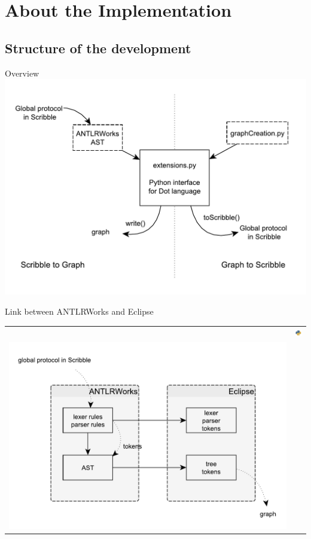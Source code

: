 \documentclass[8 pt]{beamer}
\begin{document}
\section{About the Implementation}

\subsection{Structure of the development}
\begin{frame}{Overview}
\includegraphics[scale=0.6]{structure}
\end{frame}

\begin{frame}{Link between ANTLRWorks and Eclipse}
\begin{tabular}{lr}
 &\includegraphics[width=0.7cm]{python}\\
\includegraphics[scale=0.5]{zoomstructure}&\\
\end{tabular}
\end{frame}
\end{document}
